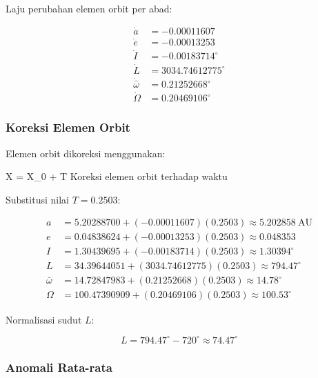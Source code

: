 Laju perubahan elemen orbit per abad:

{\setlength{\abovedisplayskip}{8pt}%
\setlength{\belowdisplayskip}{8pt}%
\[
\begin{split}
\dot{a} &= -0.00011607 \\
\dot{e} &= -0.00013253 \\
\dot{I} &= -0.00183714^\circ \\
\dot{L} &= 3034.74612775^\circ \\
\dot{\bar{\omega}} &= 0.21252668^\circ \\
\dot{\Omega} &= 0.20469106^\circ
\end{split}
\]
}


\subsubsection*{Koreksi Elemen Orbit}

Elemen orbit dikoreksi menggunakan:

\begin{equationcaptioned}{
X = X_0 +  \cdot T
}{
Koreksi elemen orbit terhadap waktu
}
\end{equationcaptioned}

Substitusi nilai \(T = 0.2503\):

{\setlength{\abovedisplayskip}{8pt}%
\setlength{\belowdisplayskip}{8pt}%
\[
\begin{split}
a &= 5.20288700 + (-0.00011607)(0.2503)
\approx 5.202858\ \text{AU} \\
e &= 0.04838624 + (-0.00013253)(0.2503)
\approx 0.048353 \\
I &= 1.30439695 + (-0.00183714)(0.2503)
\approx 1.30394^\circ \\
L &= 34.39644051 + (3034.74612775)(0.2503)
\approx 794.47^\circ \\
\bar{\omega} &= 14.72847983 + (0.21252668)(0.2503)
\approx 14.78^\circ \\
\Omega &= 100.47390909 + (0.20469106)(0.2503)
\approx 100.53^\circ
\end{split}
\]
}

Normalisasi sudut \(L\):

{\setlength{\abovedisplayskip}{8pt}%
\setlength{\belowdisplayskip}{8pt}%
\[
L = 794.47^\circ - 720^\circ
\approx 74.47^\circ
\]
}


\subsubsection*{Anomali Rata-rata}

